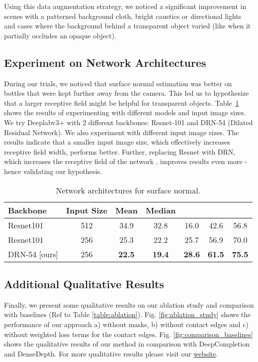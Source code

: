\documentclass[letterpaper, 10 pt, conference]{ieeeconf}
\newcommand{\tabref}[1]{Table~\ref{#1}}
\begin{document}
Using this data augmentation strategy, we noticed a significant improvement in scenes with a patterned background cloth, bright caustics or directional lights and cases where the background behind a transparent object varied (like when it partially occludes an opaque object).


\subsection{Experiment on Network Architectures}
During our trials, we noticed that surface normal estimation was better on bottles that were kept further away from the camera. This led us to hypothesize that a larger receptive field might be helpful for transparent objects. \tabref{table:receptive_field} shows the results of experimenting with different models and input image sizes. We try Deeplabv3+ with 2 different backbones: Resnet-101 and DRN-54 (Dilated Residual Network). We also experiment with different input image sizes. The results indicate that a smaller input image size, which effectively increases receptive field width, performs better. Further, replacing Resnet with DRN, which increases the receptive field of the network \cite{Yu2017}, improves results even more - hence validating our hypothesis.

\begin{table}[ht]
    \centering
    \setlength\tabcolsep{3px}
    \begin{tabular}{l|c|ccccc}
        \toprule
        Backbone & Input Size & Mean & Median &  &  &  \\
        \midrule
        Resnet101  & 512 & 34.9 & 32.8 & 16.0 & 42.6 & 56.8 \\
        Resnet101  & 256 & 25.3 & 22.2 & 25.7 & 56.9 & 70.0 \\
        DRN-54 [ours] & 256 & \textbf{22.5 }& \textbf{19.4} & \textbf{28.6} & \textbf{61.5} & \textbf{ 75.5 }\\
        \bottomrule 
    \end{tabular}
    \caption{Network architectures for surface normal.}
    \label{table:receptive_field}
\end{table}

\subsection{Additional Qualitative Results}
Finally, we present some qualitative results on our ablation study and comparison with baselines (Ref to Table \ref{table:ablation}). 
Fig. \ref{fig:ablation_study} shows the performance of our approach a) without masks, b) without contact edges and c) without weighted loss terms for the contact edges.
Fig. \ref{fig:comparison_baselines} shows the qualitative results of our method in comparison with DeepCompletion and DenseDepth.
For more qualitative results please visit our \href{https://sites.google.com/view/cleargrasp}{website}. 
\end{document}
